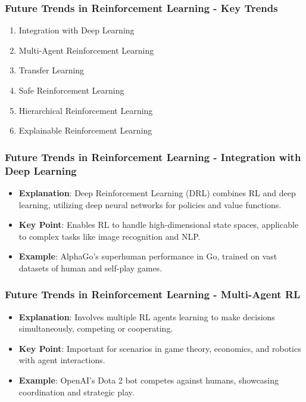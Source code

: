 \documentclass[aspectratio=169]{beamer}
\begin{document}
\begin{frame}[fragile]
    \frametitle{Future Trends in Reinforcement Learning - Key Trends}
    \begin{enumerate}
        \item Integration with Deep Learning
        \item Multi-Agent Reinforcement Learning
        \item Transfer Learning
        \item Safe Reinforcement Learning
        \item Hierarchical Reinforcement Learning
        \item Explainable Reinforcement Learning
    \end{enumerate}
\end{frame}

\begin{frame}[fragile]
    \frametitle{Future Trends in Reinforcement Learning - Integration with Deep Learning}
    \begin{itemize}
        \item \textbf{Explanation}: Deep Reinforcement Learning (DRL) combines RL and deep learning, utilizing deep neural networks for policies and value functions.
        \item \textbf{Key Point}: Enables RL to handle high-dimensional state spaces, applicable to complex tasks like image recognition and NLP. 
        \item \textbf{Example}: AlphaGo's superhuman performance in Go, trained on vast datasets of human and self-play games.
    \end{itemize}
\end{frame}

\begin{frame}[fragile]
    \frametitle{Future Trends in Reinforcement Learning - Multi-Agent RL}
    \begin{itemize}
        \item \textbf{Explanation}: Involves multiple RL agents learning to make decisions simultaneously, competing or cooperating.
        \item \textbf{Key Point}: Important for scenarios in game theory, economics, and robotics with agent interactions.
        \item \textbf{Example}: OpenAI's Dota 2 bot competes against humans, showcasing coordination and strategic play.
    \end{itemize}
\end{frame}
\end{document}
